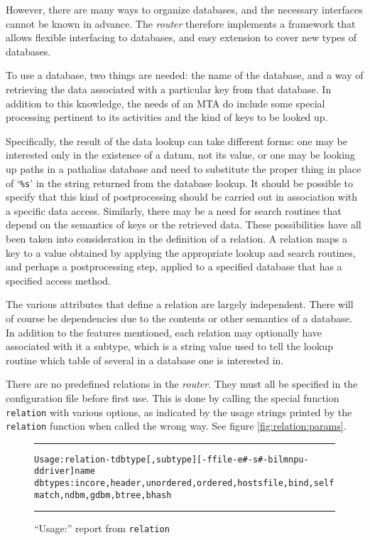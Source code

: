 However, there are many ways to organize databases, and the necessary
interfaces cannot be known in advance.  The {\em router} therefore implements a
framework that allows flexible interfacing to databases, and easy extension
to cover new types of databases.

To use a database, two things are needed: the name of the database, and a
way of retrieving the data associated with a particular key from that
database.  In addition to this knowledge, the needs of an MTA do include
some special processing pertinent to its activities and the kind of keys to
be looked up.

Specifically, the result of the data lookup can take different forms: one
may be interested only in the existence of a datum, not its value, or one
may be looking up paths in a pathalias database and need to substitute the
proper thing in place of `{\tt \%s}' in the string returned from the database
lookup.  It should be possible to specify that this kind of postprocessing
should be carried out in association with a specific data access.
Similarly, there may be a need for search routines that depend on the
semantics of keys or the retrieved data.  These possibilities have all been
taken into consideration in the definition of a relation.  A relation maps
a key to a value obtained by applying the appropriate lookup and search
routines, and perhaps a postprocessing step, applied to a specified
database that has a specified access method.

The various attributes that define a relation are largely independent.
There will of course be dependencies due to the contents or other semantics
of a database.  In addition to the features mentioned, each relation may
optionally have associated with it a subtype, which is a string value used
to tell the lookup routine which table of several in a database
one is interested in.

There are no predefined relations in the {\em router}.
They must all be specified in the configuration file before first use.
This is done by calling the special function {\tt relation} with
various options, as indicated by the usage strings printed by
the {\tt relation} function when called the wrong way.
See figure \vref{fig:relation:params}.

\begin{figure*}
\begin{alltt}\medskip\hrule\medskip
Usage: relation -t dbtype[,subtype] [-f file -e# -s# -bilmnpu -d driver] name
  dbtypes: incore,header,unordered,ordered,hostsfile,bind,selfmatch,ndbm,gdbm,btree,bhash
\medskip\hrule\end{alltt}\medskip
\caption{\label{fig:relation:params}``Usage:'' report from {\tt relation}} 
\end{figure*}

